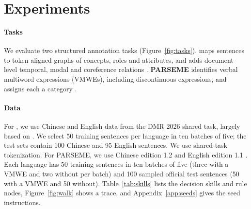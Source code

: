 \section{Experiments}
\label{sec:setup}

\paragraph{Tasks}
We evaluate two structured annotation tasks (Figure~\ref{fig:tasks}). \textbf{\umr} maps sentences to token-aligned graphs of concepts, roles and attributes, and adds document-level temporal, modal and coreference relations \citep{gysel2021design,bonn2025umr2}. \textbf{PARSEME} identifies verbal multiword expressions (VMWEs), including discontinuous expressions, and assigns each a category \citep{ramisch2018parseme,ramisch2020parseme}.

\paragraph{Data}
For \umr, we use Chinese and English data from the DMR 2026 shared task, largely based on  \citep{stepanek2026first}. We select 50 training sentences per language in ten batches of five; the test sets contain 100 Chinese and 95 English sentences. We use shared-task tokenization. For PARSEME, we use Chinese edition 1.2 \citep{ramisch2020parseme} and English edition 1.1 \citep{ramisch2018parseme}. Each language has 50 training sentences in ten batches of five (three with a VMWE and two without per batch) and 100 sampled official test sentences (50 with a VMWE and 50 without).
Table~\ref{tab:skills} lists the decision skills and rule nodes, Figure~\ref{fig:walk} shows a \umr trace, and Appendix~\ref{app:seeds} gives the seed instructions.

